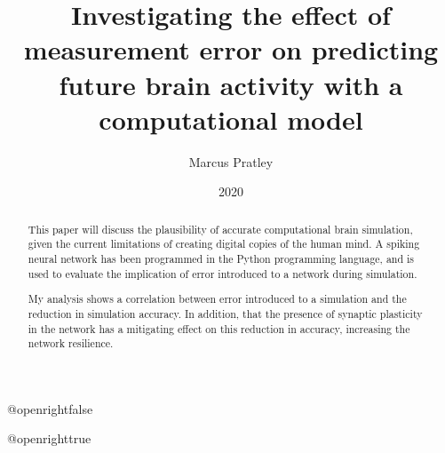 \documentclass[10.5pt,twoside,openright]{report}
\title{Investigating the effect of measurement error on predicting future brain
activity with a computational model}
\author{Marcus Pratley}
\date{2020}
\begin{document}
\csname @openrightfalse\endcsname

\maketitle

\declaration

\dedication{With thanks to Frances Hutchins and Prof. Marcus Kaiser, who have both been a great help throughout the unusually fraught environment of creating this dissertation. \\ \vspace{1ex} Extra thanks also to my family, and parents in particular, for all their love and support over the course of my degree. }

\begin{abstract}
This paper will discuss the plausibility of accurate computational brain
simulation, given the current limitations of creating digital copies of the
human mind. A spiking neural network has been programmed in the Python programming language, and is used to evaluate the implication of error introduced to a network during simulation. 

My analysis shows a correlation between error introduced to a simulation and the reduction in simulation accuracy. In addition, that the presence of synaptic plasticity in the network has a mitigating effect on this reduction in accuracy, increasing the network resilience.

\end{abstract}

\def\table{\def\figurename{Table}\figure}
\let\endtable\endfigure
\renewcommand\listfigurename{List of Figures and Tables}

\tableofcontents
\listoffigures
\csname @openrighttrue\endcsname




% 



\printbibliography[heading=bibintoc]
\end{document}
